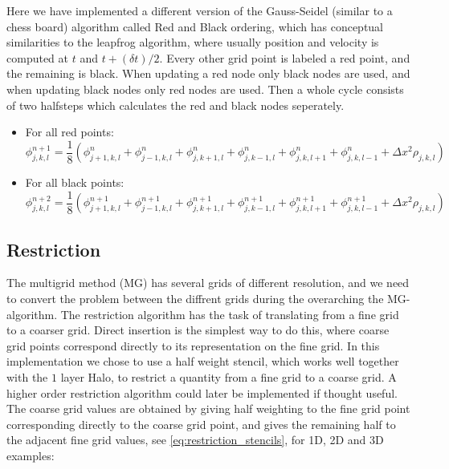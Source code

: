     	Here we have implemented a different version of the Gauss-Seidel (similar to a chess board) algorithm called Red and Black ordering, which has conceptual similarities
    	to the leapfrog algorithm, where usually position and velocity is computed at \(t\) and \( t+(\delta t)/2 \). Every other grid point is labeled a
    	red point, and the remaining is black. When updating a red node only black nodes are used, and when updating black nodes only
    	red nodes are used. Then a whole cycle consists of two halfsteps which calculates the red and black nodes seperately.

    	\begin{itemize}
    		\item For all red points:
    			\[\phi^{n+1}_{j,k,l} = \frac{1}{8} \left( \phi^{n}_{j+1,k,l} +\phi^{n}_{j-1,k,l} + \phi^n_{j,k+1,l} + \phi^{n}_{j,k-1,l} +
    	 							\phi^n_{j,k,l+1} + \phi^{n}_{j,k,l-1} + \Delta x^2 \rho_{j,k,l} \right)
    			\]
    		\item For all black points:
    		\[\phi^{n+2}_{j,k,l} = \frac{1}{8} \left( \phi^{n+1}_{j+1,k,l} +\phi^{n+1}_{j-1,k,l} + \phi^{n+1}_{j,k+1,l} + \phi^{n+1}_{j,k-1,l} +
    							\phi^{n+1}_{j,k,l+1} + \phi^{n+1}_{j,k,l-1} + \Delta x^2 \rho_{j,k,l} \right)
    		\]
    	\end{itemize}

        \subsection{Restriction}
        	\label{sec:restr_simple}
        	The multigrid method (MG) has several grids of different resolution, and we need to
         	convert the problem between the diffrent grids during the overarching the MG-algorithm.
         	The restriction algorithm has the task of translating from a fine grid to a coarser grid.
			Direct insertion is the simplest way to do this, where coarse grid points
			correspond directly to its representation on the fine grid.
        	In this implementation we chose to use a half weight stencil, which works well together
			with the \(1\) layer Halo, to restrict a quantity from a fine
        	grid to a coarse grid. A higher order restriction algorithm could later
			be implemented if thought useful. The coarse grid values are obtained by giving half weighting to
        	the fine grid point corresponding directly to the coarse grid point, and gives the remaining
        	half to the adjacent fine grid values, see \eqref{eq:restriction_stencils}, for 1D,
        	2D and 3D examples:

